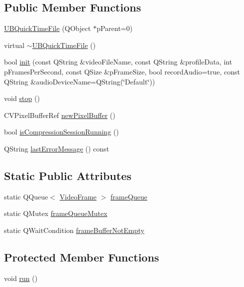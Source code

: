 \subsection*{Public Member Functions}
\begin{DoxyCompactItemize}
\item 
\hyperlink{class_u_b_quick_time_file_a8b183929af839adda8469c50aafec804}{U\-B\-Quick\-Time\-File} (Q\-Object $\ast$p\-Parent=0)
\item 
virtual \hyperlink{class_u_b_quick_time_file_a325ab25a94fb3b6652117ab1347afc0f}{$\sim$\-U\-B\-Quick\-Time\-File} ()
\item 
bool \hyperlink{class_u_b_quick_time_file_a71331fb2262b24bd4eb10a7764bfe6cb}{init} (const Q\-String \&video\-File\-Name, const Q\-String \&profile\-Data, int p\-Frames\-Per\-Second, const Q\-Size \&p\-Frame\-Size, bool record\-Audio=true, const Q\-String \&audio\-Device\-Name=Q\-String(\char`\"{}Default\char`\"{}))
\item 
void \hyperlink{class_u_b_quick_time_file_a30f0b207a0bd98228663be5ee93bfb62}{stop} ()
\item 
C\-V\-Pixel\-Buffer\-Ref \hyperlink{class_u_b_quick_time_file_aa499bdf13d0882700d43d966fa2115d0}{new\-Pixel\-Buffer} ()
\item 
bool \hyperlink{class_u_b_quick_time_file_afd6079763923599898f37a64570442e9}{is\-Compression\-Session\-Running} ()
\item 
Q\-String \hyperlink{class_u_b_quick_time_file_af93b4c47885cd60be9732b5916349363}{last\-Error\-Message} () const 
\end{DoxyCompactItemize}
\subsection*{Static Public Attributes}
\begin{DoxyCompactItemize}
\item 
static Q\-Queue$<$ \hyperlink{struct_u_b_quick_time_file_1_1_video_frame}{Video\-Frame} $>$ \hyperlink{class_u_b_quick_time_file_a284f54a169c1a7b24b7d0ff7fc907f2d}{frame\-Queue}
\item 
static Q\-Mutex \hyperlink{class_u_b_quick_time_file_a8179154729e1bfcda66f9c0cd52ec2cb}{frame\-Queue\-Mutex}
\item 
static Q\-Wait\-Condition \hyperlink{class_u_b_quick_time_file_adadd465cfdc1fb11d583b56b9b388128}{frame\-Buffer\-Not\-Empty}
\end{DoxyCompactItemize}
\subsection*{Protected Member Functions}
\begin{DoxyCompactItemize}
\item 
void \hyperlink{class_u_b_quick_time_file_a40bd8000c77cd381fe894a3660cdb3b4}{run} ()
\end{DoxyCompactItemize}


